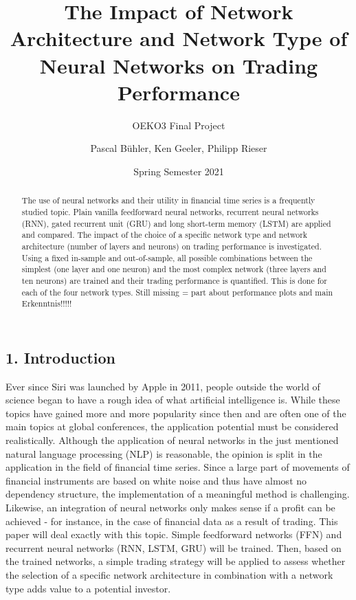 \documentclass[
]{article}
\title{The Impact of Network Architecture and Network Type of Neural
Networks on Trading Performance}
\subtitle{OEKO3 Final Project}
\author{Pascal Bühler, Ken Geeler, Philipp Rieser}
\date{Spring Semester 2021}
\begin{document}
\maketitle
\begin{abstract}
The use of neural networks and their utility in financial time series is
a frequently studied topic. Plain vanilla feedforward neural networks,
recurrent neural networks (RNN), gated recurrent unit (GRU) and long
short-term memory (LSTM) are applied and compared. The impact of the
choice of a specific network type and network architecture (number of
layers and neurons) on trading performance is investigated. Using a
fixed in-sample and out-of-sample, all possible combinations between the
simplest (one layer and one neuron) and the most complex network (three
layers and ten neurons) are trained and their trading performance is
quantified. This is done for each of the four network types. Still
missing = part about performance plots and main Erkenntnis!!!!!
\end{abstract}

\newpage

\setcounter{tocdepth}{4}
\tableofcontents

\newpage
{}

\hypertarget{introduction}{%
\subsection{1. Introduction}\label{introduction}}

Ever since Siri was launched by Apple in 2011, people outside the world
of science began to have a rough idea of what artificial intelligence
is. While these topics have gained more and more popularity since then
and are often one of the main topics at global conferences, the
application potential must be considered realistically. Although the
application of neural networks in the just mentioned natural language
processing (NLP) is reasonable, the opinion is split in the application
in the field of financial time series. Since a large part of movements
of financial instruments are based on white noise and thus have almost
no dependency structure, the implementation of a meaningful method is
challenging. Likewise, an integration of neural networks only makes
sense if a profit can be achieved - for instance, in the case of
financial data as a result of trading. This paper will deal exactly with
this topic. Simple feedforward networks (FFN) and recurrent neural
networks (RNN, LSTM, GRU) will be trained. Then, based on the trained
networks, a simple trading strategy will be applied to assess whether
the selection of a specific network architecture in combination with a
network type adds value to a potential investor.
\end{document}
